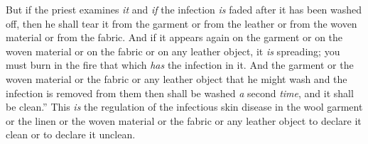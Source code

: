 \begin{biblechapter}
\verse But if the priest examines \textit{it} and \textit{if} the infection \textit{is} faded after it has been washed off, then he shall tear it from the garment or from the leather or from the woven material or from the fabric.
\verse And if it appears again on the garment or on the woven material or on the fabric or on any leather object, it \textit{is} spreading; you must burn in the fire that which \textit{has} the infection in it.
\verse And the garment or the woven material or the fabric or any leather object that he might wash and the infection is removed from them then shall be washed \textit{a} second \textit{time}, and it shall be clean.”
\verse This \textit{is} the regulation of the infectious skin disease in the wool garment or the linen or the woven material or the fabric or any leather object to declare it clean or to declare it unclean.
\end{biblechapter}


